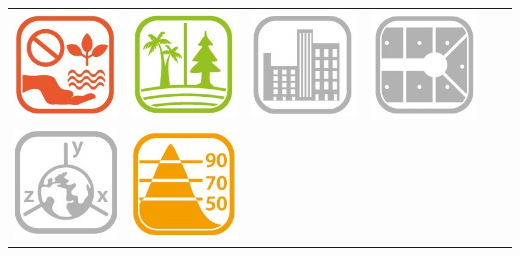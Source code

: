 \begin{frame}
\begin{center}
\begin{center}
\begin{tabular}{c c c c c c}
\includegraphics[scale=0.2]{obrazky/INSPIRE_Temata/AM.jpg} & \includegraphics[scale=0.2]{obrazky/INSPIRE_Temata/BR.jpg} & \includegraphics[scale=0.2]{obrazky/INSPIRE_Temata/BU.jpg} & \includegraphics[scale=0.2]{obrazky/INSPIRE_Temata/CP.jpg}\\
\includegraphics[scale=0.2]{obrazky/INSPIRE_Temata/CRS.jpg} & \includegraphics[scale=0.2]{obrazky/INSPIRE_Temata/EL.jpg} &

\end{tabular}
\end{center}
\end{center}
\end{frame}
